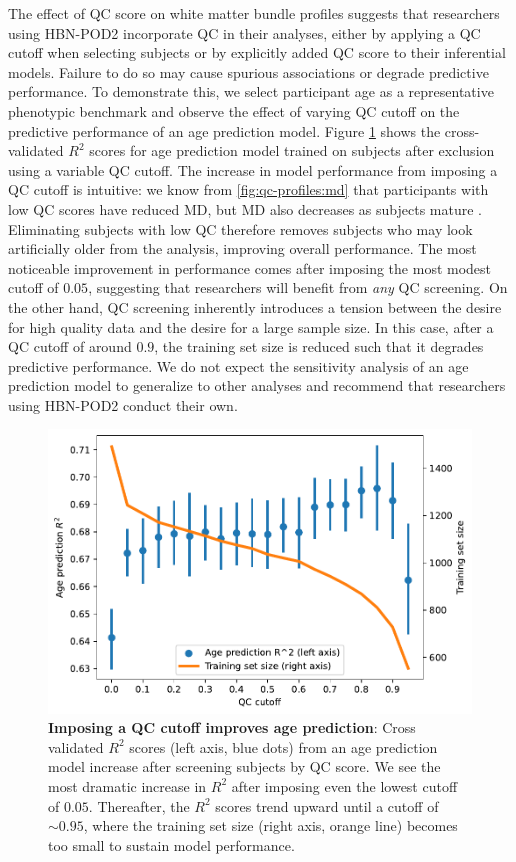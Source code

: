 \documentclass[fleqn,10pt]{wlscirep}
\begin{document}
The effect of QC score on white matter bundle profiles suggests that researchers
using HBN-POD2 incorporate QC in their analyses, either by applying a QC cutoff
when selecting subjects or by explicitly added QC score to their inferential
models. Failure to do so may cause spurious associations or degrade predictive
performance. To demonstrate this, we select participant age as a representative
phenotypic benchmark \cite{cole2019brain,richie-halford2021multidimensional} and
observe the effect of varying QC cutoff on the predictive performance of an age
prediction model. Figure \ref{fig:age-prediction} shows the cross-validated
$R^2$ scores for age prediction model trained on subjects after exclusion using a
variable QC cutoff. The increase in model performance from imposing a QC cutoff
is intuitive: we know from \ref{fig:qc-profiles:md} that participants with
low QC scores have reduced MD, but MD also decreases as subjects mature
\cite{yeatman2014lifespan,richie-halford2021multidimensional}.
Eliminating subjects with low QC therefore removes subjects who may look
artificially older from the analysis, improving overall performance.  The most
noticeable improvement in performance comes after imposing the most modest
cutoff of $0.05$, suggesting that researchers will benefit from \emph{any} QC
screening. On the other hand, QC screening inherently introduces a tension
between the desire for high quality data and the desire for a large sample size.
In this case, after a QC cutoff of around $0.9$, the training set size is
reduced such that it degrades predictive performance. We do not expect the
sensitivity analysis of an age prediction model to generalize to other
analyses and recommend that researchers using HBN-POD2 conduct their own.

\begin{figure}[htbp]
    \centering
    \includegraphics[width=0.5\linewidth]{age-prediction/qc_sweep.pdf}
    \caption{%
        {\bf Imposing a QC cutoff improves age prediction}:
        Cross validated $R^2$ scores (left axis, blue dots) from an age
        prediction model increase after screening subjects by QC score.  We see
        the most dramatic increase in $R^2$ after imposing even the lowest
        cutoff of $0.05$. Thereafter, the $R^2$ scores trend upward until a
        cutoff of $\sim 0.95$, where the training set size (right axis, orange
        line) becomes too small to sustain model performance.
    }
    \label{fig:age-prediction}
\end{figure}
\end{document}
